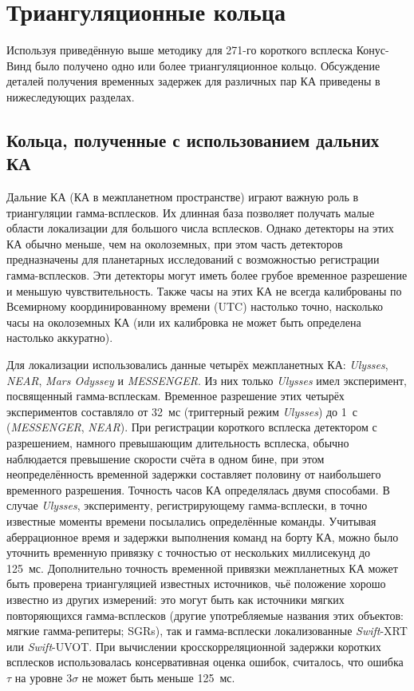 \section{Триангуляционные кольца}
Используя приведённую выше методику для 271-го короткого всплеска Конус-Винд было 
получено одно или более триангуляционное кольцо. Обсуждение деталей получения 
временных задержек для различных пар КА приведены в нижеследующих разделах.

\subsection{Кольца, полученные с использованием дальних КА}
Дальние КА (КА в межпланетном пространстве) играют важную роль в триангуляции 
гамма-всплесков. Их длинная база позволяет получать малые области локализации 
для большого числа всплесков. Однако детекторы на этих КА обычно меньше, чем на 
околоземных, при этом часть детекторов предназначены для планетарных исследований 
с возможностью регистрации гамма-всплесков. Эти детекторы могут иметь более 
грубое временное разрешение и меньшую чувствительность. Также часы на этих КА 
не всегда калиброваны по Всемирному координированному времени (UTC) настолько точно, 
насколько часы на околоземных КА (или их калибровка не может быть определена настолько аккуратно).

Для локализации использовались данные четырёх межпланетных КА: \textit{Ulysses}, 
\textit{NEAR}, \textit{Mars Odyssey} и \textit{MESSENGER}. Из них только \textit{Ulysses} 
имел эксперимент, посвященный гамма-всплескам. Временное разрешение этих четырёх 
экспериментов составляло от 32~мс (триггерный режим \textit{Ulysses}) 
до 1~с (\textit{MESSENGER}, \textit{NEAR}). При регистрации короткого всплеска 
детектором с разрешением, намного превышающим длительность всплеска, обычно 
наблюдается превышение скорости счёта в одном бине, при этом неопределённость 
временной задержки составляет половину от наибольшего временного разрешения. 
Точность часов КА определялась двумя способами. 
В случае \textit{Ulysses}, эксперименту, регистрирующему гамма-всплески, 
в точно известные моменты времени посылались определённые команды. 
Учитывая аберрационное время и задержки выполнения команд на борту КА, 
можно было уточнить временную привязку с точностью от нескольких миллисекунд 
до 125~мс. 
Дополнительно точность временной привязки межпланетных КА может быть проверена 
триангуляцией известных источников, чьё положение хорошо известно из других измерений: 
это могут быть как источники мягких повторяющихся гамма-всплесков 
(другие употребляемые названия этих объектов: мягкие гамма-репитеры; SGRs), 
так и гамма-всплески локализованные \textit{Swift}-XRT 
или \textit{Swift}-UVOT. При вычислении кросскорреляционной задержки коротких всплесков
использовалась консервативная оценка ошибок, считалось, 
что ошибка $\tau$ на уровне $3\sigma$ не может быть меньше 125~мс.

